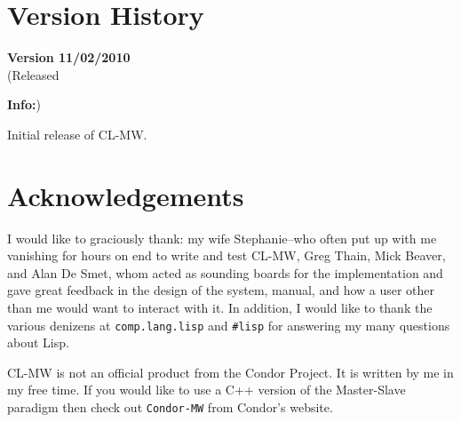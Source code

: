 \documentclass[titlepage,12pt]{book}
\newcommand{\xsmall}{\latexhtml{\small}{}}
\newcommand{\xnormalsize}{\latexhtml{\normalsize}{}}
\newcommand{\mw}{Master-Slave\xspace}
\newcommand{\clmw}{\xsmall\textsc{CL-MW}\xnormalsize\xspace}
\newcommand{\bold}[1]{\textbf{#1}\xspace}
\newenvironment{verhist}[2]
	{\textbf{Version #1}\\\indent\xsmall(Released #2)\xnormalsize
	 \begin{itemize}}
	{\end{itemize}}
\newcommand{\info}{\item \bold{Info:}\xspace}
\begin{document}
\chapter{\label{version-history}Version History}


\begin{verhist}{0.1}{11/02/2010}
\info Initial release of \clmw.
\end{verhist}

\chapter{Acknowledgements}

I would like to graciously thank: my wife Stephanie--who often put
up with me vanishing for hours on end to write and test \clmw, Greg
Thain, Mick Beaver, and Alan De Smet, whom acted as sounding boards
for the implementation and gave great feedback in the design of the
system, manual, and how a user other than me would want to interact
with it. In addition, I would like to thank the various denizens at
\texttt{comp.lang.lisp} and \texttt{\#lisp} for answering my many
questions about Lisp.

\clmw is not an official product from the Condor Project. It is written
by me in my free time. If you would like to use a C++ version of the
\mw paradigm then check out \texttt{Condor-MW} from Condor's website.

\backmatter
\end{document}

